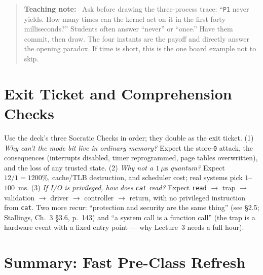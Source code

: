 \documentclass[11pt]{article}
\newenvironment{teachingaside}{\begin{quote}\small\color{primary-gold}\textbf{Teaching note:}\ }{\end{quote}}
\begin{document}
\begin{teachingaside}
Ask before drawing the three-process trace: ``\texttt{P1} never yields. How many times can the kernel act on it in the first forty milliseconds?'' Students often answer ``never'' or ``once.'' Have them commit, then draw. The four instants are the payoff and directly answer the opening paradox. If time is short, this is the one board example not to skip.
\end{teachingaside}

\section{Exit Ticket and Comprehension Checks}

Use the deck's three Socratic Checks in order; they double as the exit ticket. (1) \emph{Why can't the mode bit live in ordinary memory?} Expect the store-\texttt{0} attack, the consequences (interrupts disabled, timer reprogrammed, page tables overwritten), and the loss of any trusted state. (2) \emph{Why not a $1\ \mu\text{s}$ quantum?} Expect $12/1=1200\%$, cache/TLB destruction, and scheduler cost; real systems pick $1$--$100$~ms. (3) \emph{If I/O is privileged, how does \texttt{cat} read?} Expect \texttt{read} $\to$ trap $\to$ validation $\to$ driver $\to$ controller $\to$ return, with no privileged instruction from \texttt{cat}. Two more recur: ``protection and security are the same thing'' (see §2.5; Stallings, Ch.~3 §3.6, p.~143) and ``a system call is a function call'' (the trap is a hardware event with a fixed entry point --- why Lecture~3 needs a full hour).

\section{Summary: Fast Pre-Class Refresh}
\end{document}
